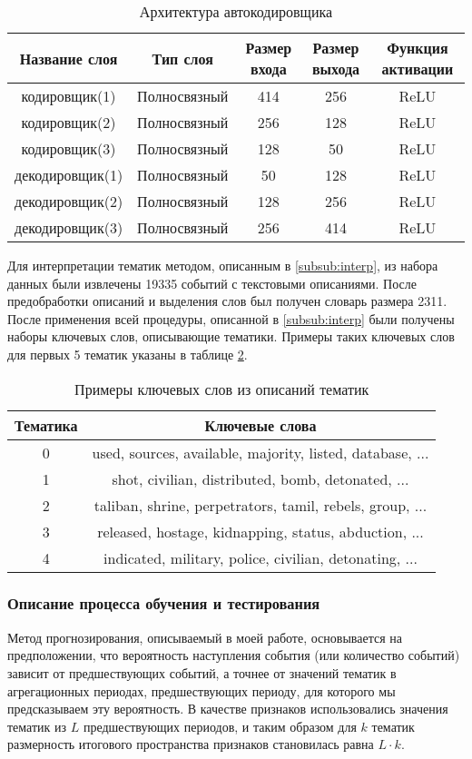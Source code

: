 \begin{table}
\centering
 \begin{tabular}{| c | c | c | c | c |} 
 \hline
 Название слоя & Тип слоя & Размер входа & Размер выхода & Функция активации\\
 \hline
 \hline
 кодировщик(1) & Полносвязный & 414 & 256 & ReLU\\ 
 \hline
 кодировщик(2) & Полносвязный & 256 & 128 & ReLU\\ 
 \hline
 кодировщик(3) & Полносвязный & 128 & 50 & ReLU\\ 
 \hline
 декодировщик(1) & Полносвязный & 50 & 128 & ReLU\\ 
 \hline
 декодировщик(2) & Полносвязный & 128 & 256 & ReLU\\ 
 \hline
 декодировщик(3) & Полносвязный & 256 & 414 & ReLU\\ 
 \hline
\end{tabular}
\caption{Архитектура автокодировщика}
\label{table:ae_arch}
\end{table}

Для интерпретации тематик методом, описанным в \ref{subsub:interp}, из набора данных были извлечены 19335 событий с текстовыми описаниями. После предобработки описаний и выделения слов был получен словарь размера 2311. После применения всей процедуры, описанной в \ref{subsub:interp} были получены наборы ключевых слов, описывающие тематики. Примеры таких ключевых слов для первых 5 тематик указаны в таблице \ref{table:kw_example}.

\begin{table}
\centering
 \begin{tabular}{c c} 
 \hline
 Тематика & Ключевые слова\\ 
 \hline
 \hline
 0 & used, sources, available, majority, listed, database, ...\\
 \hline
 1 & shot, civilian, distributed, bomb, detonated, ...\\
 \hline
 2 & taliban, shrine, perpetrators, tamil, rebels, group, ...\\
 \hline
 3 & released, hostage, kidnapping, status, abduction, ...\\
 \hline
 4 & indicated, military, police, civilian, detonating, ...\\
 \hline
 \end{tabular}
\caption{Примеры ключевых слов из описаний тематик }
\label{table:kw_example}
\end{table}


\subsubsection{Описание процесса обучения и тестирования} \label{train_process}
Метод прогнозирования, описываемый в моей работе, основывается на предположении, что вероятность наступления события (или количество событий) зависит от предшествующих событий, а точнее от значений тематик в агрегационных периодах, предшествующих периоду, для которого мы предсказываем эту вероятность.
В качестве признаков использовались значения тематик из $L$ предшествующих периодов, и таким образом для $k$ тематик размерность итогового пространства признаков становилась равна $L \cdot k$.

